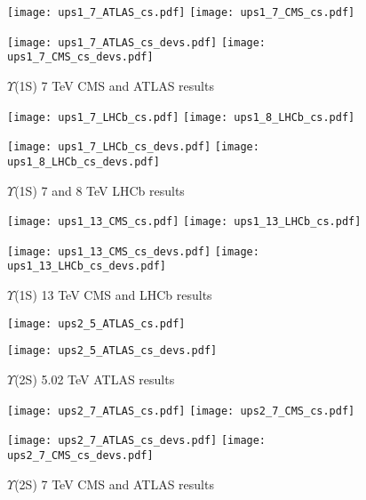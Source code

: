 \documentclass{article}
\begin{document}
\clearpage

\begin{figure}
\centering
\texttt{[image: ups1\_7\_ATLAS\_cs.pdf]}
\texttt{[image: ups1\_7\_CMS\_cs.pdf]}

\texttt{[image: ups1\_7\_ATLAS\_cs\_devs.pdf]}
\texttt{[image: ups1\_7\_CMS\_cs\_devs.pdf]}
\caption{$\Upsilon$(1S) 7 TeV CMS and ATLAS results}
\end{figure}

\clearpage

\begin{figure}
\centering
\texttt{[image: ups1\_7\_LHCb\_cs.pdf]}
\texttt{[image: ups1\_8\_LHCb\_cs.pdf]}

\texttt{[image: ups1\_7\_LHCb\_cs\_devs.pdf]}
\texttt{[image: ups1\_8\_LHCb\_cs\_devs.pdf]}
\caption{$\Upsilon$(1S) 7 and 8 TeV LHCb results}
\end{figure}

\clearpage

\begin{figure}
\centering
\texttt{[image: ups1\_13\_CMS\_cs.pdf]}
\texttt{[image: ups1\_13\_LHCb\_cs.pdf]}

\texttt{[image: ups1\_13\_CMS\_cs\_devs.pdf]}
\texttt{[image: ups1\_13\_LHCb\_cs\_devs.pdf]}
\caption{$\Upsilon$(1S) 13 TeV CMS and LHCb results}
\end{figure}

\clearpage

\begin{figure}
\centering
\texttt{[image: ups2\_5\_ATLAS\_cs.pdf]}

\texttt{[image: ups2\_5\_ATLAS\_cs\_devs.pdf]}
\caption{$\Upsilon$(2S) 5.02 TeV ATLAS results}
\end{figure}

\clearpage

\begin{figure}
\centering
\texttt{[image: ups2\_7\_ATLAS\_cs.pdf]}
\texttt{[image: ups2\_7\_CMS\_cs.pdf]}

\texttt{[image: ups2\_7\_ATLAS\_cs\_devs.pdf]}
\texttt{[image: ups2\_7\_CMS\_cs\_devs.pdf]}
\caption{$\Upsilon$(2S) 7 TeV CMS and ATLAS results}
\end{figure}
\end{document}
